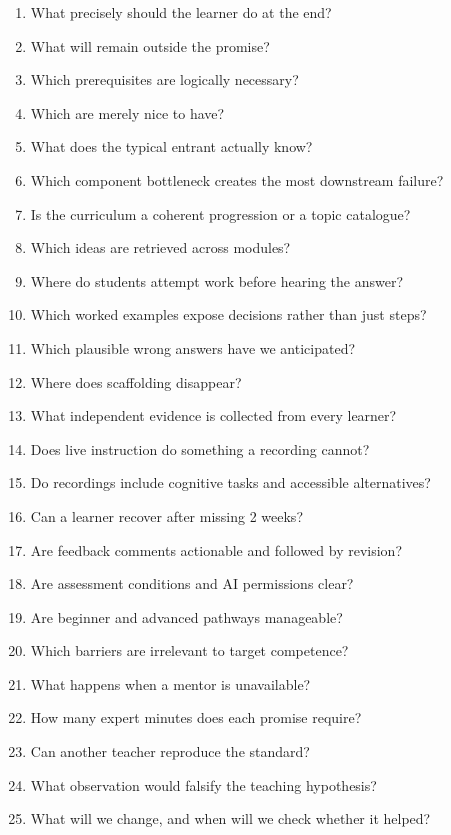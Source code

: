 \begin{enumerate}[leftmargin=2em, itemsep=0.4em]
    \item What precisely should the learner do at the end?
    \item What will remain outside the promise?
    \item Which prerequisites are logically necessary?
    \item Which are merely nice to have?
    \item What does the typical entrant actually know?
    \item Which component bottleneck creates the most downstream failure?
    \item Is the curriculum a coherent progression or a topic catalogue?
    \item Which ideas are retrieved across modules?
    \item Where do students attempt work before hearing the answer?
    \item Which worked examples expose decisions rather than just steps?
    \item Which plausible wrong answers have we anticipated?
    \item Where does scaffolding disappear?
    \item What independent evidence is collected from every learner?
    \item Does live instruction do something a recording cannot?
    \item Do recordings include cognitive tasks and accessible alternatives?
    \item Can a learner recover after missing 2 weeks?
    \item Are feedback comments actionable and followed by revision?
    \item Are assessment conditions and AI permissions clear?
    \item Are beginner and advanced pathways manageable?
    \item Which barriers are irrelevant to target competence?
    \item What happens when a mentor is unavailable?
    \item How many expert minutes does each promise require?
    \item Can another teacher reproduce the standard?
    \item What observation would falsify the teaching hypothesis?
    \item What will we change, and when will we check whether it helped?
\end{enumerate}

